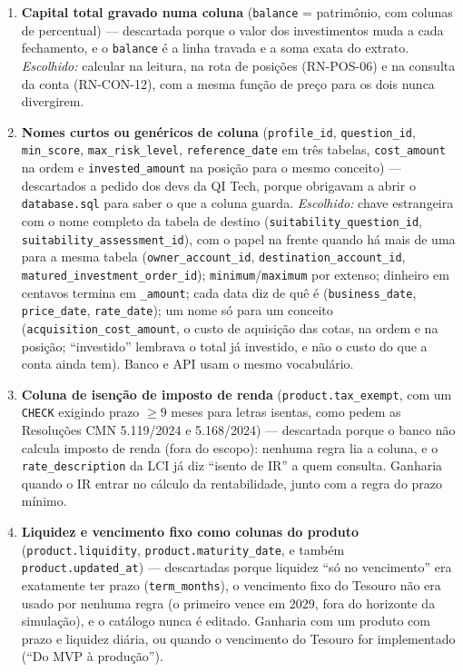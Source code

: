 \documentclass[11pt,a4paper]{article}
\newcommand{\tb}[1]{\texttt{#1}}           %
\begin{document}
\begin{enumerate}
  da opção), \tb{suitability_assessment.valid_until} e \tb{forced_by_rule} (calculados),
  \tb{ledger_entry.entry_key} (nunca sai na API), \tb{product.own_issue} (= sem
  \tb{price_source_code}), \tb{investment_order.source} e \tb{status} (calculado e constante) e a
  tabela \tb{model_portfolio} (1:1 com o perfil, e o nome nunca saía na API).
  \item \textbf{Capital total gravado numa coluna} (\tb{balance} = patrimônio, com colunas de
  percentual) --- descartada porque o valor dos investimentos muda a cada fechamento, e o
  \tb{balance} é a linha travada e a soma exata do extrato. \emph{Escolhido:} calcular na leitura,
  na rota de posições (RN-POS-06) e na consulta da conta (RN-CON-12), com a mesma função de preço
  para os dois nunca divergirem.
  \item \textbf{Nomes curtos ou genéricos de coluna} (\tb{profile_id}, \tb{question_id},
  \tb{min_score}, \tb{max_risk_level}, \tb{reference_date} em três tabelas, \tb{cost_amount} na ordem
  e \tb{invested_amount} na posição para o mesmo conceito) --- descartados a pedido dos devs da QI Tech, porque obrigavam a abrir o
  \tb{database.sql} para saber o que a coluna guarda. \emph{Escolhido:} chave estrangeira com o
  nome completo da tabela de destino (\tb{suitability_question_id}, \tb{suitability_assessment_id}), com
  o papel na frente quando há mais de uma para a mesma tabela (\tb{owner_account_id},
  \tb{destination_account_id}, \tb{matured_investment_order_id}); \tb{minimum}/\tb{maximum} por
  extenso; dinheiro em centavos termina em \tb{_amount}; cada data diz de quê é
  (\tb{business_date}, \tb{price_date}, \tb{rate_date}); um nome só para um conceito
  (\tb{acquisition_cost_amount}, o custo de aquisição das cotas, na ordem e na posição; ``investido''
  lembrava o total já investido, e não o custo do que a conta ainda tem). Banco e API usam o mesmo
  vocabulário.
  \item \textbf{Coluna de isenção de imposto de renda} (\tb{product.tax_exempt}, com um \tb{CHECK}
  exigindo prazo $\ge 9$ meses para letras isentas, como pedem as Resoluções CMN 5.119/2024 e
  5.168/2024) --- descartada porque o banco não calcula imposto de renda (fora do escopo): nenhuma
  regra lia a coluna, e o \tb{rate_description} da LCI já diz ``isento de IR'' a quem consulta.
  Ganharia quando o IR entrar no cálculo da rentabilidade, junto com a regra do prazo mínimo.
  \item \textbf{Liquidez e vencimento fixo como colunas do produto} (\tb{product.liquidity},
  \tb{product.maturity_date}, e também \tb{product.updated_at}) --- descartadas porque liquidez
  ``só no vencimento'' era exatamente ter prazo (\tb{term_months}), o vencimento fixo do Tesouro
  não era usado por nenhuma regra (o primeiro vence em 2029, fora do horizonte da simulação), e o
  catálogo nunca é editado. Ganharia com um produto com prazo e liquidez diária, ou quando o
  vencimento do Tesouro for implementado (``Do MVP à produção'').

\end{enumerate}
\end{document}
